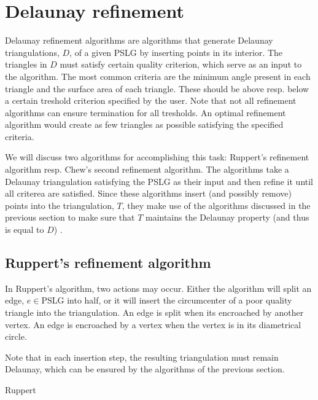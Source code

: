 \section{Delaunay refinement}
\label{sec:refinement}

Delaunay refinement algorithms are algorithms that generate Delaunay triangulations, $D$, of a given PSLG by inserting points in its interior.
The triangles in $D$ must satisfy certain quality criterion, which serve as an input to the algorithm.
The most common criteria are the minimum angle present in each triangle and the surface area of each triangle.
These should be above resp. below a certain treshold criterion specified by the user.
Note that not all refinement algorithms can ensure termination for all tresholds.
An optimal refinement algorithm would create as few triangles as possible satisfying the specified criteria.

We will discuss two algorithms for accomplishing this task: Ruppert's refinement algorithm resp. Chew's second refinement algorithm.
The algorithms take a Delaunay triangulation satisfying the PSLG as their input and then refine it until all criterea are satisfied.
Since these algorithms insert (and possibly remove) points into the triangulation, $T$, they make use of the algorithms discussed in the previous section
to make sure that $T$ maintains the Delaunay property (and thus is equal to $D$) \cite{shewchuk}.

\subsection{Ruppert's refinement algorithm}
\label{sub:ruppert}

In Ruppert's algorithm, two actions may occur.
Either the algorithm will split an edge, $e \in \mathrm{PSLG}$ into half,
or it will insert the circumcenter of a poor quality triangle into the triangulation.
An edge is split when its encroached by another vertex.
An edge is encroached by a vertex when the vertex is in its diametrical circle. \cite{shewchuk}

Note that in each insertion step, the resulting triangulation must remain Delaunay,
which can be ensured by the algorithms of the previous section.

\begin{algorithm}
    \caption{Ruppert}
    \begin{algorithmic}
                \Else
                \EndIf
            \EndWhile
        \EndFunction
    \end{algorithmic}
    \label{alg:Ruppert}
\end{algorithm}

